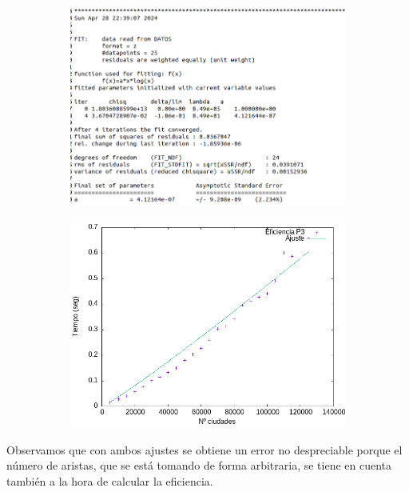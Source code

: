 \documentclass{article}
\begin{document}
\begin{figure}[H]
    \begin{subfigure}{0.5\textwidth}
        \centering
        \includegraphics[width=\textwidth]{Problema3/imagenes/log-lin-log.png}
    \end{subfigure} \hfill
    \begin{subfigure}{0.5\textwidth}
        \centering
        \includegraphics[width=\textwidth]{Problema3/imagenes/regresion-lin-logP3.png}
    \end{subfigure}
\end{figure}

Observamos que con ambos ajustes se obtiene un error no despreciable porque el número de aristas, que se está tomando de forma arbitraria, se tiene en cuenta también a la hora de calcular la eficiencia.
\end{document}

